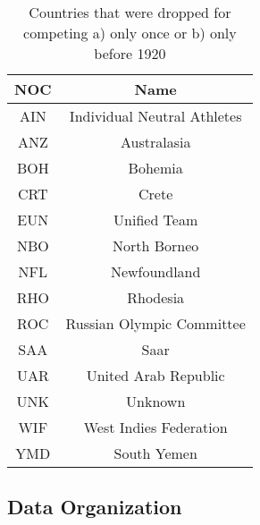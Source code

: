 \documentclass[12pt]{article}
\begin{document}
\begin{table}[h]
\centering
	\begin{tabular}{|c|c|}
		\hline
		NOC & Name\\
		\hline
		\hline
		AIN & Individual Neutral Athletes\\\hline
		ANZ & Australasia\\\hline
		BOH & Bohemia \\\hline
		CRT & Crete\\\hline
		EUN & Unified Team\\\hline
		NBO & North Borneo\\\hline
		NFL & Newfoundland\\\hline
		RHO & Rhodesia\\\hline
		ROC & Russian Olympic Committee\\\hline
		SAA & Saar\\\hline
		UAR & United Arab Republic \\\hline
		UNK & Unknown\\\hline
		WIF & West Indies Federation\\\hline
		YMD & South Yemen\\\hline
	\end{tabular}
	\caption{Countries that were dropped for competing a) only once or b) only before 1920}

\end{table}



\subsection{Data Organization}
\end{document}
